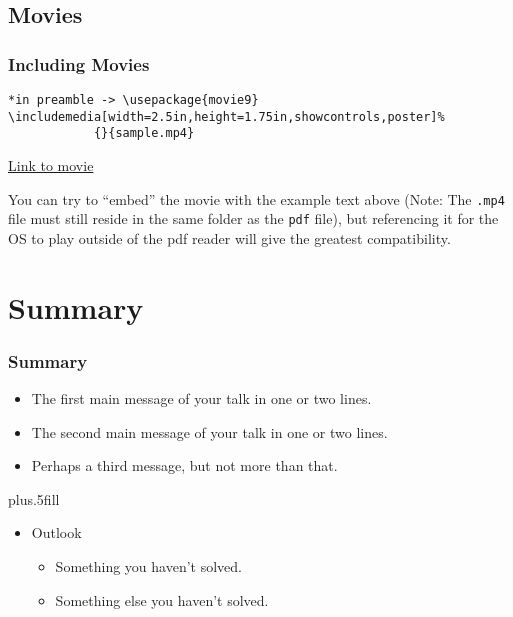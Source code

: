 \subsection{Movies}

\begin{frame}[fragile]
  \frametitle{Including Movies}
\begin{verbatim}
*in preamble -> \usepackage{movie9}
\includemedia[width=2.5in,height=1.75in,showcontrols,poster]%
            {}{sample.mp4}
\end{verbatim}

\href{run:sample.mp4}{Link to movie}
\medskip


You can try to ``embed'' the movie with the example text above 
(Note: The \texttt{.mp4} file must still reside in the same folder as the
\texttt{pdf} file), but referencing it for the OS to play outside of the pdf
reader will give the greatest compatibility.
\end{frame}

\section*{Summary}

\begin{frame}
  \frametitle<presentation>{Summary}

  \begin{itemize}
  \item
    The \alert{first main message} of your talk in one or two lines.\pause
  \item
    The \alert{second main message} of your talk in one or two lines.\pause
  \item
    Perhaps a \alert{third message}, but not more than that.\pause
  \end{itemize}
  
  \vskip0pt plus.5fill
  \begin{itemize}
  \item
    Outlook
    \begin{itemize}
    \item
      Something you haven't solved\supercite{gulliver1976}. 
    \item
      Something else you haven't solved\cite{PP98}.
    \end{itemize}
  \end{itemize}
  \nocite{*}
\end{frame}

